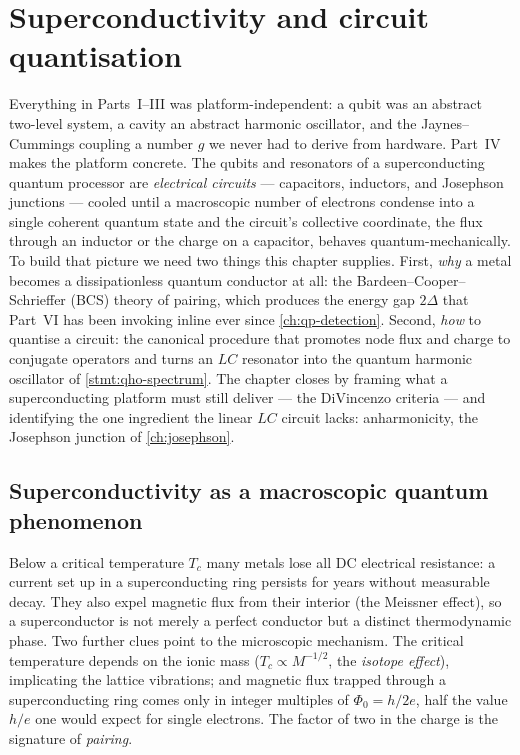 \chapter{Superconductivity and circuit quantisation}
\label{ch:circuit-quantisation}

Everything in Parts~I--III was platform-independent: a qubit was an
abstract two-level system, a cavity an abstract harmonic oscillator,
and the Jaynes--Cummings coupling a number $g$ we never had to
derive from hardware. Part~IV makes the platform concrete. The
qubits and resonators of a superconducting quantum processor are
\emph{electrical circuits} --- capacitors, inductors, and Josephson
junctions --- cooled until a macroscopic number of electrons condense
into a single coherent quantum state and the circuit's collective
coordinate, the flux through an inductor or the charge on a
capacitor, behaves quantum-mechanically. To build that picture we
need two things this chapter supplies. First, \emph{why} a metal
becomes a dissipationless quantum conductor at all: the
Bardeen--Cooper--Schrieffer (BCS) theory of pairing, which produces
the energy gap $2\Delta$ that Part~VI has been invoking inline ever
since \cref{ch:qp-detection}. Second, \emph{how} to quantise a
circuit: the canonical procedure that promotes node flux and charge
to conjugate operators and turns an $LC$ resonator into the quantum
harmonic oscillator of \cref{stmt:qho-spectrum}. The chapter closes
by framing what a superconducting platform must still deliver --- the
DiVincenzo criteria --- and identifying the one ingredient the linear
$LC$ circuit lacks: anharmonicity, the Josephson junction of
\cref{ch:josephson}.

\section{Superconductivity as a macroscopic quantum phenomenon}
\label{sec:superconductivity-phenom}

\begin{phenomenon}
Below a critical temperature $T_c$ many metals lose all DC
electrical resistance: a current set up in a superconducting ring
persists for years without measurable decay. They also expel
magnetic flux from their interior (the Meissner effect), so a
superconductor is not merely a perfect conductor but a distinct
thermodynamic phase. Two further clues point to the microscopic
mechanism. The critical temperature depends on the ionic mass
($T_c\propto M^{-1/2}$, the \emph{isotope effect}), implicating the
lattice vibrations; and magnetic flux trapped through a
superconducting ring comes only in integer multiples of
$\Phi_0=h/2e$, half the value $h/e$ one would expect for single
electrons. The factor of two in the charge is the signature of
\emph{pairing}.
\end{phenomenon}

